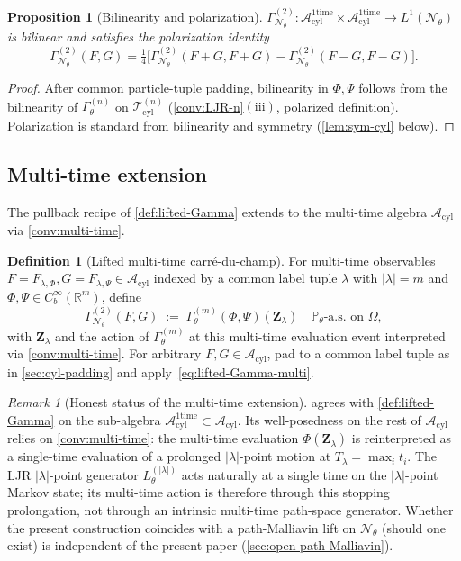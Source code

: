 \documentclass[11pt,reqno]{amsart}
\theoremstyle{plain}
\newtheorem{proposition}[theorem]{Proposition}
\theoremstyle{definition}
\newtheorem{definition}[theorem]{Definition}
\theoremstyle{remark}
\newtheorem{remark}[theorem]{Remark}
\newcommand{\R}{\mathbb R}
\newcommand{\Prob}{\mathbb P}
\newcommand{\cA}{\mathcal A}
\newcommand{\cN}{\mathcal N}
\newcommand{\cT}{\mathcal T}
\newcommand{\Acyl}{\cA_{\mathrm{cyl}}}
\newcommand{\Aone}{\cA_{\mathrm{cyl}}^{\mathrm{1time}}}
\newcommand{\Tcyl}{\cT_{\mathrm{cyl}}}
\newcommand{\GamN}{\Gamma^{(2)}_{\cN_{\theta}}}
\newcommand{\GamM}[1]{\Gamma^{(#1)}_{\theta}}
\newcommand{\Lth}[1]{L^{(#1)}_{\theta}}
\newcommand{\Pth}{\Prob_{\theta}}
\begin{document}
\begin{proposition}[Bilinearity and polarization]\label{prop:bilinear}
$\GamN\colon\Aone\times\Aone\to L^{1}(\cN_{\theta})$ is bilinear
and satisfies the polarization identity
\begin{equation}\label{eq:polarization}
  \GamN(F,G)
  =\tfrac14\bigl[\GamN(F+G,F+G)-\GamN(F-G,F-G)\bigr].
\end{equation}
\end{proposition}

\begin{proof}
After common particle-tuple padding, bilinearity in $\Phi,\Psi$
follows from the bilinearity of $\GamM{n}$ on $\Tcyl^{(n)}$
(\cref{conv:LJR-n}$(\mathrm{iii})$, polarized definition).
Polarization is standard from bilinearity and symmetry
(\cref{lem:sym-cyl} below).
\end{proof}

\subsection{Multi-time extension}\label{sec:lifted-multi}

The pullback recipe of \cref{def:lifted-Gamma} extends to the
multi-time algebra $\Acyl$ via \cref{conv:multi-time}.

\begin{definition}[Lifted multi-time carr\'e-du-champ]\label{def:lifted-Gamma-multi}
For multi-time observables
$F=F_{\lambda,\Phi},G=F_{\lambda,\Psi}\in\Acyl$ indexed by a common
label tuple $\lambda$ with $|\lambda|=m$ and
$\Phi,\Psi\in C_{b}^{\infty}(\R^{m})$, define
\begin{equation}\label{eq:lifted-Gamma-multi}
  \GamN(F,G)\;:=\;\GamM{m}(\Phi,\Psi)(\mathbf Z_{\lambda})
  \quad\Pth\text{-a.s.\ on }\Omega,
\end{equation}
with $\mathbf Z_{\lambda}$ and the action of $\GamM{m}$ at this
multi-time evaluation event interpreted via
\cref{conv:multi-time}. For arbitrary $F,G\in\Acyl$, pad to a
common label tuple as in \cref{sec:cyl-padding} and
apply~\eqref{eq:lifted-Gamma-multi}.
\end{definition}

\begin{remark}[Honest status of the multi-time extension]\label{rem:multi-time-status}
 agrees with \cref{def:lifted-Gamma}
on the sub-algebra $\Aone\subset\Acyl$. Its well-posedness on the
rest of $\Acyl$ relies on \cref{conv:multi-time}: the multi-time
evaluation $\Phi(\mathbf Z_{\lambda})$ is reinterpreted as a
single-time evaluation of a prolonged $|\lambda|$-point motion at
$T_{\lambda}=\max_{i}t_{i}$. The LJR $|\lambda|$-point generator
$\Lth{|\lambda|}$ acts naturally at a single time on the
$|\lambda|$-point Markov state; its multi-time action is therefore
through this stopping prolongation, not through an intrinsic
multi-time path-space generator. Whether the present construction
coincides with a path-Malliavin lift on $\cN_{\theta}$ (should one
exist) is independent of the present paper
(\cref{sec:open-path-Malliavin}).
\end{remark}
\end{document}
